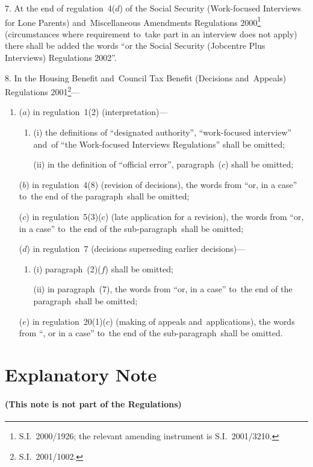\documentclass[12pt,a4paper]{article}
\begin{document}
7.  At the end of regulation~4($d$)  of the Social Security (Work-focused Interviews for Lone Parents) and~Miscellaneous Amendments Regulations 2000\footnote{S.I.~2000/1926; the relevant amending instrument is S.I.~2001/3210.} (circumstances where requirement to~take part in an interview does not apply) there shall be added the words “or the Social Security (Jobcentre Plus Interviews) Regulations 2002”.

\medskip

8.  In the Housing Benefit and~Council Tax Benefit (Decisions and~Appeals) Regulations 2001\footnote{S.I.~2001/1002.}—
\begin{enumerate}\item[]
($a$) in regulation~1(2) (interpretation)—
\begin{enumerate}\item[]
(i) the definitions of “designated authority”, “work-focused interview” and~of “the Work-focused Interviews Regulations” shall be omitted;

(ii) in the definition of “official error”, paragraph~($c$)  shall be omitted;
\end{enumerate}

($b$) in regulation~4(8) (revision of decisions), the words from “or, in a case” to~the end of the paragraph~shall be omitted;

($c$) in regulation~5(3)($c$)  (late application for a revision), the words from “or, in a case” to~the end of the sub-paragraph~shall be omitted;

($d$) in regulation~7 (decisions superseding earlier decisions)—
\begin{enumerate}\item[]
(i) paragraph~(2)($f$)  shall be omitted;

(ii) in paragraph~(7), the words from “or, in a case” to~the end of the paragraph~shall be omitted;
\end{enumerate}

($e$) in regulation~20(1)($c$)  (making of appeals and~applications), the words from “, or in a case” to~the end of the sub-paragraph~shall be omitted.
\end{enumerate}

\part{Explanatory Note}

\renewcommand\parthead{— Explanatory Note}

\subsection*{(This note is not part of the Regulations)}
\end{document}
